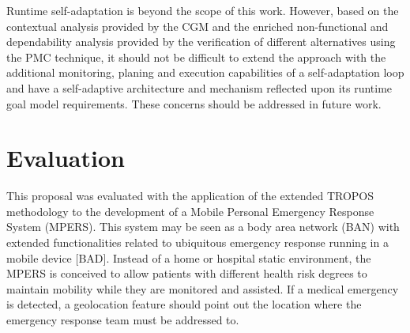 
Runtime self-adaptation is beyond the scope of this work. However, based on the contextual analysis provided by the CGM and the enriched non-functional and dependability analysis provided by the verification of different alternatives using the PMC technique, it should not be difficult to extend the approach with the additional monitoring, planing and execution capabilities of a self-adaptation loop and have a self-adaptive architecture and mechanism reflected upon its runtime goal model requirements. These concerns should be addressed in future work.




\section{Evaluation}

This proposal was evaluated with the application of the extended TROPOS methodology to the development of a Mobile Personal Emergency Response System (MPERS). This system may be seen as a body area network (BAN) with extended functionalities related to ubiquitous emergency response running in a mobile device [BAD]. Instead of a home or hospital static environment, the MPERS is conceived to allow patients with different health risk degrees to maintain mobility while they are monitored and assisted. If a medical emergency is detected, a geolocation feature should point out the location where the emergency response team must be addressed to. 

